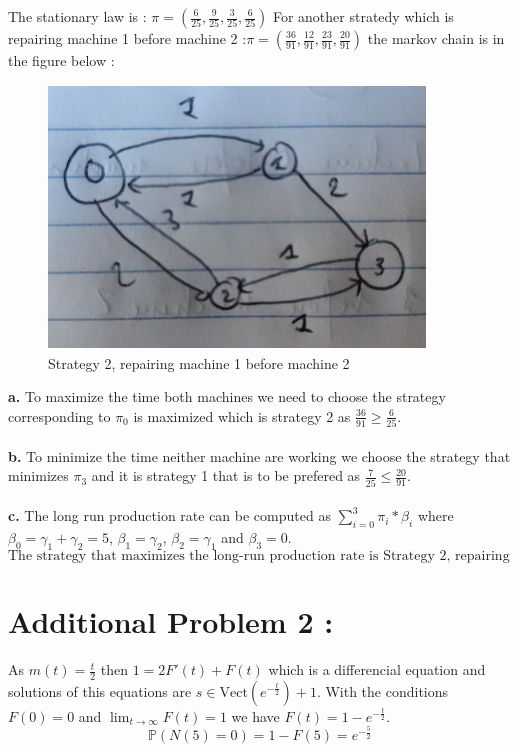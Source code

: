 \documentclass{article}
\begin{document}
The stationary law is : $\pi = (\frac{6}{25},\frac{9}{25},\frac{3}{25},\frac{6}{25})$
For another stratedy which is repairing machine 1 before machine 2 :$\pi = (\frac{36}{91},\frac{12}{91},\frac{23}{91},\frac{20}{91})$ the markov chain is in the figure below : 
\begin{figure}[H]
    \begin{center}
        \includegraphics*[width = 10cm,height = 7cm]{img/strategy2.png}
    \end{center}
    \caption{Strategy 2, repairing machine 1 before machine 2}
\end{figure}

\textbf{a.} To maximize the time both machines we need to choose the strategy corresponding to $\pi_0$ is maximized which is strategy 2 as $\frac{36}{91} \ge \frac{6}{25}$.
\\\\
\textbf{b.} To minimize the time neither machine are working we choose the strategy that minimizes $\pi_3$ and it is strategy 1 that is to be prefered as $\frac{7}{25}\leq \frac{20}{91}$.
\\\\
\textbf{c.} The long run production rate can be computed as $\sum\limits_{i=0}^3\pi_i*\beta_i$ where $\beta_0 = \gamma_1+\gamma_2 = 5$, $\beta_1 = \gamma_2$, $\beta_2 = \gamma_1$ and $\beta_3 = 0$. $$\boxed{\text{The strategy that maximizes the long-run production rate is Strategy 2, repairing machine 1 before machine 2.}}$$
\section*{Additional Problem 2 :}
As $m(t) = \frac{t}{2}$ then $1 = 2F'(t)+F(t)$ which is a differencial equation and solutions of this equations are $s\in \text{Vect}(e^{-\frac{t}{2}})+1$. With the conditions $F(0) = 0$ and $\lim_{t\to\infty}F(t) = 1$ we have $F(t) = 1-e^{-\frac{t}{2}}$.
$$\boxed{\mathbb{P}(N(5) = 0) = 1-F(5) = e^{-\frac{5}{2}}}$$ 
\end{document}

